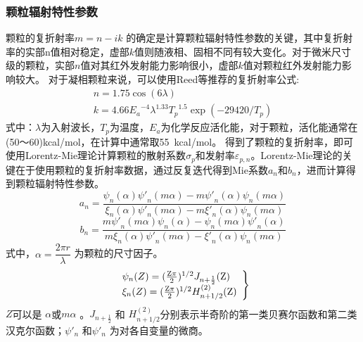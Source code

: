 \subsubsection{颗粒辐射特性参数}
颗粒的复折射率$m=n-ik$ 的确定是计算颗粒辐射特性参数的关键，其中复折射率的实部n值相对稳定，虚部$k$值则随液相、固相不同有较大变化。对于微米尺寸级的颗粒，实部$n$值对其红外发射能力影响很小，虚部$k$值对颗粒红外发射能力影响较大。
对于凝相颗粒来说，可以使用Reed等推荐的复折射率公式:
\begin{equation}
\begin{array}{l}
n = 1.75\cos (6\lambda )\\
k = 4.66{E_a}^{ - 4}{\lambda ^{1.33}}{T_p}^{1.5}\exp ( - 29420/{T_p})
\end{array}\label{eq:zheselv}
\end{equation}
式中：$\lambda$为入射波长，$T_p$为温度，$E_a$为化学反应活化能，对于颗粒，活化能通常在(50～60)\si{kcal/mol}，在计算中通常取\SI{55}{kcal/mol}。
得到了颗粒的复折射率，即可使用Lorentz-Mie理论计算颗粒的散射系数$\sigma_p$和发射率$\varepsilon_{p,n}$。Lorentz-Mie理论的关键在于使用颗粒的复折射率数据，通过反复迭代得到Mie系数$a_n$和$b_n$，进而计算得到颗粒辐射特性参数。
\begin{equation}
{a_n} = \frac{{{\psi _n}(\alpha ){{\psi '}_n}(m\alpha ) - m{{\psi '}_n}(\alpha ){\psi _n}(m\alpha )}}{{{\xi _n}(\alpha ){{\psi '}_n}(m\alpha ) - m{{\xi '}_n}(\alpha ){\psi _n}(m\alpha )}}
\end{equation}
\begin{equation}
{b_n} = \frac{{m{{\psi '}_n}(m\alpha ){\psi _n}(\alpha ) - {\psi _n}(m\alpha ){{\psi '}_n}(\alpha )}}{{m{\xi _n}(\alpha ){{\psi '}_n}(m\alpha ) - {{\xi '}_n}(\alpha ){\psi _n}(m\alpha )}}
\end{equation}
式中，$\alpha = \dfrac{2 \pi r}{\lambda}$ 为颗粒的尺寸因子。
\begin{equation}
\left. \begin{array}{l}
{\psi _n}(Z) = {(\frac{{{\rm Z}\pi }}{2})^{1/2}}{J_{n + \frac{1}{2}}}({\rm Z})\\
{\xi _n}(Z) = {(\frac{{{\rm Z}\pi }}{2})^{1/2}}H_{n + 1/2}^{(2)}({\rm Z})
\end{array} \right\}
\end{equation}
 $Z$可以是 $\alpha$或$m\alpha$ 。$J_{n+\frac{1}{2}}$ 和 $H_{n + 1/2}^{(2)}$分别表示半奇阶的第一类贝赛尔函数和第二类汉克尔函数；$\psi'_n$ 和$\psi'_n$ 为对各自变量的微商。

